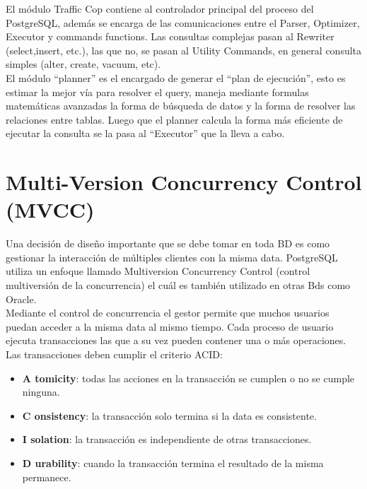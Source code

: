 El módulo Traffic Cop contiene al controlador principal del proceso del PostgreSQL, además se encarga de las comunicaciones entre el Parser, Optimizer, Executor y commands functions. Las consultas complejas pasan al Rewriter (select,insert, etc.), las que no, se pasan al Utility Commands, en general consulta simples (alter, create, vacuum, etc).\\

El módulo “planner” es el encargado de generar el “plan de ejecución”, esto es estimar la mejor vía para resolver el query, maneja mediante formulas matemáticas avanzadas la forma de búsqueda de datos y la forma de resolver las relaciones entre tablas. Luego que el planner calcula la forma más eficiente de ejecutar la consulta se la pasa al “Executor” que la lleva a cabo. \cite{Quinones}


\section{Multi-Version Concurrency Control (MVCC)}

Una decisión de diseño importante que se debe tomar en toda BD es como gestionar la interacción de múltiples clientes con la misma data. PostgreSQL utiliza un enfoque llamado Multiversion Concurrency Control (control multiversión de la concurrencia) el cuál es también utilizado en otras Bds como Oracle.\\

Mediante el control de concurrencia el gestor permite que muchos usuarios puedan acceder a la misma data al mismo tiempo. Cada proceso de usuario ejecuta transacciones las que a su vez pueden contener una o más operaciones.\\

Las transacciones deben cumplir el criterio ACID:\\

\begin{itemize}
\item \textbf{A tomicity}: todas las acciones en la transacción se cumplen o no se cumple ninguna.
\item \textbf{C onsistency}: la transacción solo termina si la data es consistente.
\item \textbf{I solation}: la transacción es independiente de otras transacciones.
\item \textbf{D urability}: cuando la transacción termina el resultado de la misma permanece.
\end{itemize}

